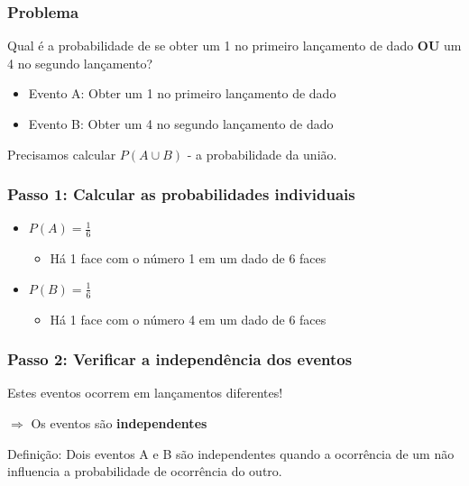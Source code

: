 \documentclass[11pt]{beamer}
\begin{document}
\begin{frame}
\frametitle{Problema}
\large
Qual é a probabilidade de se obter um 1 no primeiro lançamento de dado \textbf{OU} um 4 no segundo lançamento?

\begin{itemize}
\item Evento A: Obter um 1 no primeiro lançamento de dado
\item Evento B: Obter um 4 no segundo lançamento de dado
\end{itemize}

Precisamos calcular $P(A \cup B)$ - a probabilidade da união.
\end{frame}

\begin{frame}
\frametitle{Passo 1: Calcular as probabilidades individuais}
\large
\begin{itemize}
\item $P(A) = \frac{1}{6}$ 
\begin{itemize}
\item Há 1 face com o número 1 em um dado de 6 faces
\end{itemize}
\vspace{0.5cm}
\item $P(B) = \frac{1}{6}$ 
\begin{itemize}
\item Há 1 face com o número 4 em um dado de 6 faces
\end{itemize}
\end{itemize}
\end{frame}

\begin{frame}
\frametitle{Passo 2: Verificar a independência dos eventos}
\large
\begin{center}
Estes eventos ocorrem em lançamentos diferentes!
\end{center}

\vspace{0.5cm}
$\Rightarrow$ Os eventos são \textbf{independentes}

\vspace{0.5cm}
\begin{center}
Definição: Dois eventos A e B são independentes quando a ocorrência de um não influencia a probabilidade de ocorrência do outro.
\end{center}
\end{frame}
\end{document}
